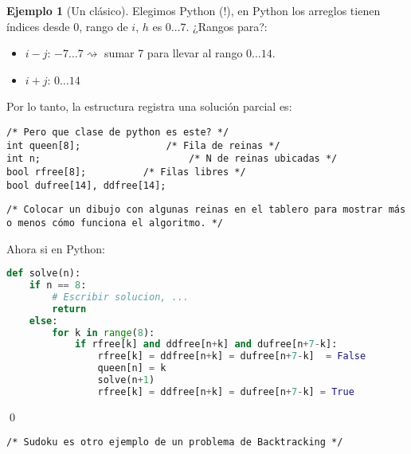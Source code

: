 \documentclass[english, spanish, fleqn, 10pt]{article}
\newcommand{\ccomment}[1]{\texttt{\textcolor{webred}{/* #1 */}}}
\numberwithin{equation}{section}
\theoremstyle{definition}
\newtheorem{beforeExample}{Ejemplo}[section]
\newenvironment{ejemplo}[1][]{\begin{beforeExample}[#1]\renewcommand{\qedsymbol}{$\blacksquare$}}{\qed\end{beforeExample}}
\begin{document}
\begin{ejemplo}[Un clásico]
	Elegimos Python (!), en Python los arreglos tienen índices desde $0$, rango de $i$, $h$ es $0\ldots 7$. ¿Rangos para?:
	\begin{itemize}
		\item $i-j$: $-7\ldots 7\rightsquigarrow$ sumar 7 para llevar al rango $0\ldots 14$.
		\item $i+j$: $0\ldots 14$
	\end{itemize}
	Por lo tanto, la estructura registra una solución parcial es:
	\begin{lstlisting}
/* Pero que clase de python es este? */
int queen[8];				/* Fila de reinas */
int n; 							/* N de reinas ubicadas */
bool rfree[8];			/* Filas libres */
bool dufree[14], ddfree[14];
	\end{lstlisting}
	\ccomment{Colocar un dibujo con algunas reinas en el tablero para mostrar más o menos cómo funciona el algoritmo.}
	
	Ahora si en Python:
	\begin{lstlisting}[language = Python]
def solve(n):
	if n == 8:
		# Escribir solucion, ...
		return 
	else:
		for k in range(8):
			if rfree[k] and ddfree[n+k] and dufree[n+7-k]:
				rfree[k] = ddfree[n+k] = dufree[n+7-k]	= False
				queen[n] = k
				solve(n+1)
				rfree[k] = ddfree[n+k] = dufree[n+7-k] = True
	\end{lstlisting}
\end{ejemplo}

\ccomment{Sudoku es otro ejemplo de un problema de Backtracking}
\end{document}
